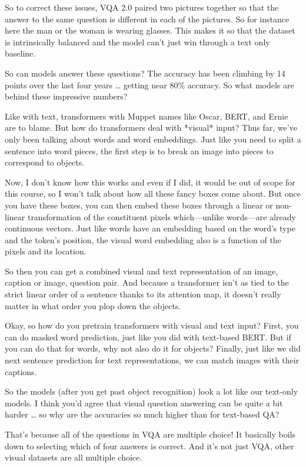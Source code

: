 So to correct these issues, VQA 2.0 paired two pictures together so that the answer to the same question is different in each of the pictures.  So for instance here the man or the woman is wearing glasses.  This makes it so that the dataset is intrinsically balanced and the model can’t just win through a text only baseline.

So can models answer these questions?  The accuracy has been climbing by 14 points over the last four years … getting near 80\% accuracy.  So what models are behind these impressive numbers?

Like with text, transformers with Muppet names like Oscar, BERT, and Ernie are to blame.  But how do transformers deal with *visual* input?  Thus far, we’ve only been talking about words and word embeddings.  Just like you need to split a sentence into word pieces, the first step is to break an image into pieces to correspond to objects.  

Now, I don’t know how this works and even if I did, it would be out of scope for this course, so I won’t talk about how all these fancy boxes come about.  But once you have these boxes, you can then embed these boxes through a linear or non-linear transformation of the constituent pixels which—unlike words—are already continuous vectors.  Just like words have an embedding based on the word’s type and the token’s position, the visual word embedding also is a function of the pixels and its location.

So then you can get a combined visual and text representation of an image, caption or image, question pair.  And because a transformer isn’t as tied to the strict linear order of a sentence thanks to its attention map, it doesn’t really matter in what order you plop down the objects. 

Okay, so how do you pretrain transformers with visual and text input?  First, you can do masked word prediction, just like you did with text-based BERT.  But if you can do that for words, why not also do it for objects?  Finally, just like we did next sentence prediction for text representations, we can match images with their captions.  

So the models (after you get past object recognition) look a lot like our text-only models.  I think you’d agree that visual question answering can be quite a bit harder … so why are the accuracies so much higher than for text-based QA?

That’s because all of the questions in VQA are multiple choice!  It basically boils down to selecting which of four answers is correct.  And it’s not just VQA, other visual datasets are all multiple choice.  

